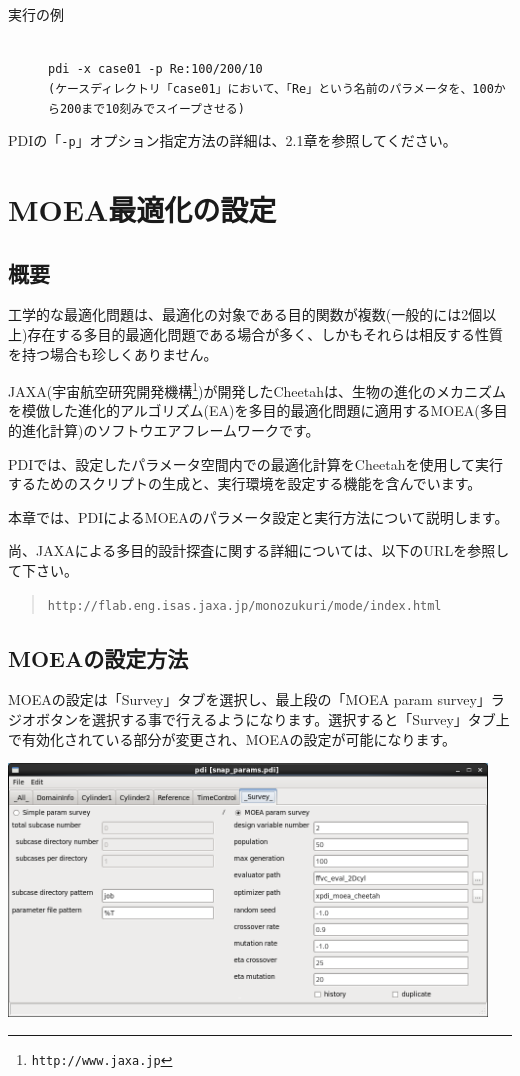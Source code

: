 \documentclass[a4paper,11pt]{jarticle}
\begin{document}
{\begin{description}
\item[実行の例] {\ }\\
{\tt pdi  -x case01  -p Re:100/200/10}\\
{\tt (ケースディレクトリ「case01」において、「Re」という名前のパラメータを、100から200まで10刻みでスイープさせる)}
\end{description}

PDIの「{\tt -p}」オプション指定方法の詳細は、2.1章を参照してください。

\newpage
\section{MOEA最適化の設定}

\subsection{概要}

工学的な最適化問題は、最適化の対象である目的関数が複数(一般的には2個以上)存在する多目的最適化問題である場合が多く、しかもそれらは相反する性質を持つ場合も珍しくありません。

JAXA(宇宙航空研究開発機構\footnote{\tt http://www.jaxa.jp})が開発したCheetahは、生物の進化のメカニズムを模倣した進化的アルゴリズム(EA)を多目的最適化問題に適用するMOEA(多目的進化計算)のソフトウエアフレームワークです。

PDIでは、設定したパラメータ空間内での最適化計算をCheetahを使用して実行するためのスクリプトの生成と、実行環境を設定する機能を含んでいます。

本章では、PDIによるMOEAのパラメータ設定と実行方法について説明します。

尚、JAXAによる多目的設計探査に関する詳細については、以下のURLを参照して下さい。
\begin{quote}
{\tt http://flab.eng.isas.jaxa.jp/monozukuri/mode/index.html}
\end{quote}


\subsection{MOEAの設定方法}

MOEAの設定は「Survey」タブを選択し、最上段の「MOEA param survey」ラジオボタンを選択する事で行えるようになります。選択すると「Survey」タブ上で有効化されている部分が変更され、MOEAの設定が可能になります。

\begin{center}
\includegraphics[width=360pt, bb=0 0 984 520]{figs/fig005.png}


\end{center}}
\end{document}
